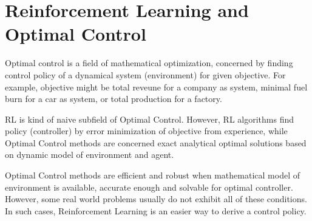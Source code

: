 \section{Reinforcement Learning and Optimal Control}
\label{sec:rl_and_control}

Optimal control is a field of mathematical optimization, 
concerned by  finding control policy of a dynamical system (environment) for given objective. 
For example, objective might be total reveune for a company as system, 
minimal fuel burn for a car as system, or total production for a factory. 

RL is kind of naive subfield of Optimal Control. 
However, RL algorithms find policy (controller) by error minimization of objective from experience, 
while Optimal Control methods are concerned exact analytical optimal solutions based on dynamic model of environment and agent. 

Optimal Control methods are efficient and robust when mathematical model of environment is available, 
accurate enough and solvable for optimal controller. 
However, some real world problems usually do not exhibit all of these conditions. 
In such cases, Reinforcement Learning is an easier way to derive a control policy.

